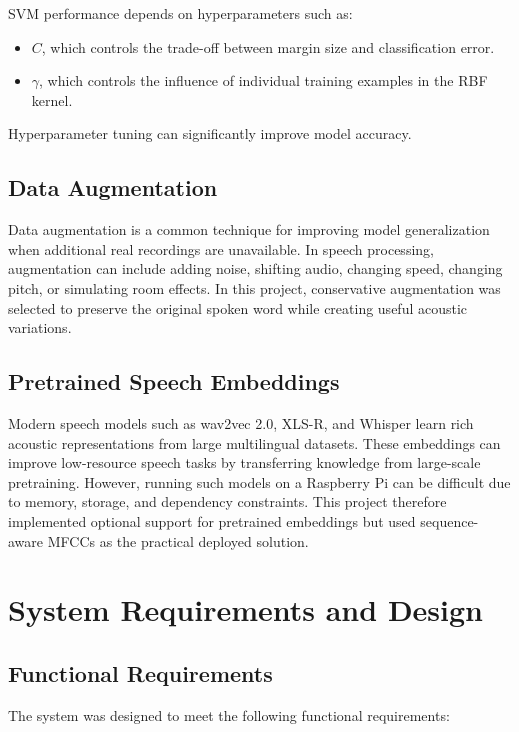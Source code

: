 \documentclass[12pt,a4paper]{report}
\begin{document}
SVM performance depends on hyperparameters such as:

\begin{itemize}
    \item \(C\), which controls the trade-off between margin size and classification error.
    \item \(\gamma\), which controls the influence of individual training examples in the RBF kernel.
\end{itemize}

Hyperparameter tuning can significantly improve model accuracy.

\section{Data Augmentation}
Data augmentation is a common technique for improving model generalization when additional real recordings are unavailable. In speech processing, augmentation can include adding noise, shifting audio, changing speed, changing pitch, or simulating room effects. In this project, conservative augmentation was selected to preserve the original spoken word while creating useful acoustic variations.

\section{Pretrained Speech Embeddings}
Modern speech models such as wav2vec 2.0, XLS-R, and Whisper learn rich acoustic representations from large multilingual datasets. These embeddings can improve low-resource speech tasks by transferring knowledge from large-scale pretraining. However, running such models on a Raspberry Pi can be difficult due to memory, storage, and dependency constraints. This project therefore implemented optional support for pretrained embeddings but used sequence-aware MFCCs as the practical deployed solution.

\chapter{System Requirements and Design}

\section{Functional Requirements}
The system was designed to meet the following functional requirements:
\end{document}
